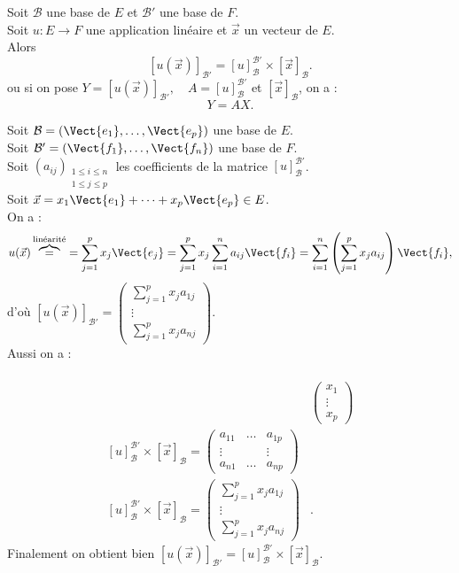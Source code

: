 \documentclass{book}
\begin{document}
\begin{Theoreme}
Soit $\mathcal{B}$ une base de $E$ et $\mathcal{B}'$ une base de $F$.\\
Soit $u:E\to F$ une application linéaire et $\vec{x}$ un vecteur de $E$.\\
Alors \[ [u(\vec{x})]_{\mathcal{B}'} = [u]_\mathcal{B}^{\mathcal{B}'} × [\vec{x}]_\mathcal{B}. \]
ou si on pose $Y=[u(\vec{x})]_{\mathcal{B}'},\quad A =[u]_\mathcal{B}^{\mathcal{B}'}$ et  $[\vec{x}]_\mathcal{B}$, on a :
$$Y=AX.$$
\end{Theoreme}
\begin{Demonstration}
Soit $\mathcal{B}=(\Vect{e_1},\dots,\Vect{e_p})$ une base de $E$.\\
Soit $\mathcal{B}'=(\Vect{f_1},\dots,\Vect{f_n})$ une base de $F$.\\
Soit $(a_{ij})_{\substack{1\leq i\leq n\\1\leq j\leq p}}$ les coefficients de la matrice $[u]_\mathcal{B}^{\mathcal{B}'}$.\\
Soit $\vec{x}=x_1\Vect{e_1}+\dots+x_p\Vect{e_p}\in E$.\\
On a :
$$u(\vec{x})\overbrace{=}^{\text{linéarité}} =\sum_{j=1}^p x_j\Vect{e_j}=\sum_{j=1}^p x_j\sum_{i=1}^n a_{ij} \Vect{f_i}=\sum_{i=1}^n \left(\sum_{j=1}^p x_j a_{ij}\right) \Vect{f_i}, $$
d'où $ [u(\vec{x})]_{\mathcal{B}'}=\begin{pmatrix}\sum_{j=1}^p x_j a_{1j} \\\vdots\\\sum_{j=1}^p x_j a_{nj} \end{pmatrix}$.\\
Aussi on a :

$$\begin{aligned}\\
 &\begin{pmatrix}x_1\\\vdots\\x_p\end{pmatrix} \\
\left[u\right]_{\mathcal{B}}^{\mathcal{B}'} \times \left[\vec{x}\right]_{\mathcal{B}}=\begin{pmatrix}
    a_{11} &  \dots & a_{1p}  \\
    \vdots &   &  \vdots  \\
    a_{n1} &  \dots & a_{np}
  \end{pmatrix}& \\
\left[u\right]_{\mathcal{B}}^{\mathcal{B}'} \times \left[\vec{x}\right]_{\mathcal{B}}=\begin{pmatrix}\sum_{j=1}^p x_j a_{1j} \\\vdots\\\sum_{j=1}^p x_j a_{nj} \end{pmatrix}&.
\end{aligned}$$
Finalement on obtient bien $ [u(\vec{x})]_{\mathcal{B}'} = [u]_\mathcal{B}^{\mathcal{B}'} × [\vec{x}]_\mathcal{B}. $
\end{Demonstration}
\end{document}
